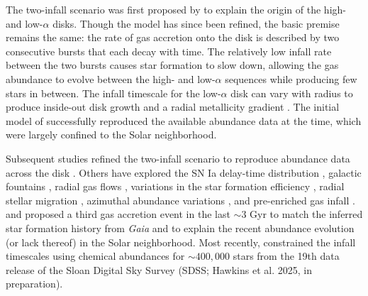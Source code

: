 \documentclass[twocolumn,twocolappendix,linenumbers]{aastex631}
\newcommand{\todo}[1]{{\color{red}#1}}
\begin{document}
The two-infall scenario was first proposed by \citet{chiappini_chemical_1997} to explain the origin of the high- and low-$\alpha$ disks. Though the model has since been refined, the basic premise remains the same: the rate of gas accretion onto the disk is described by two consecutive bursts that each decay with time. The relatively low infall rate between the two bursts causes star formation to slow down, allowing the gas abundance to evolve between the high- and low-$\alpha$ sequences while producing few stars in between. 
The infall timescale for the low-$\alpha$ disk can vary with radius to produce inside-out disk growth and a radial metallicity gradient \citep{romano_mass_2000}.
The initial model of \citet{chiappini_chemical_1997} successfully reproduced the available abundance data at the time, which were largely confined to the Solar neighborhood.

Subsequent studies refined the two-infall scenario to reproduce abundance data across the disk \citep[e.g.,][]{chiappini_abundance_2001,chiappini_oxygen_2003}. Others have explored the SN Ia delay-time distribution \citep{matteucci_effect_2009,palicio_analytic_2023}, galactic fountains \citep{spitoni_effects_2009}, radial gas flows \citep{spitoni_effects_2011,palla_chemical_2020}, variations in the star formation efficiency \citep{spitoni_effects_2011,palla_chemical_2020}, radial stellar migration \citep{spitoni_effect_2015,palla_mgfe_2022}, azimuthal abundance variations \citep{spitoni_2d_2019}, and pre-enriched gas infall \citep{palla_chemical_2020,spitoni_remind_2024}. \citet{spitoni_beyond_2023} and \citet{palla_mapping_2024} proposed a third gas accretion event in the last $\sim3$ Gyr to match the inferred star formation history from {\it Gaia} \citep{ruiz-lara_recurrent_2020} and to explain the recent abundance evolution (or lack thereof) in the Solar neighborhood. Most recently, \citet{hegedus_reconstructing_2025} constrained the infall timescales using chemical abundances for $\sim400,000$ stars from the 19th data release of the Sloan Digital Sky Survey (SDSS; \todo{Hawkins et al. 2025, in preparation}).
\end{document}
